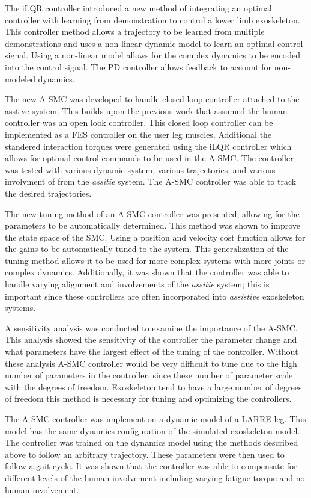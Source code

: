 The iLQR controller introduced a new method of integrating an optimal controller with learning from demonstration to control a lower limb exoskeleton. This controller method allows a trajectory to be learned from multiple demonstrations and uses a non-linear dynamic model to learn an optimal control signal.  Using a non-linear model allows for the complex dynamics to be encoded into the control signal. The PD controller allows feedback to account for non-modeled dynamics. 

The new A-SMC was developed to handle closed loop controller attached to the asstive system. This builds upon the previous work that assumed the human controller was an open look controller. This closed loop controller can be implemented as a FES controller on the user leg muscles. Additional the standered interaction torques were generated using the iLQR controller which allows for optimal control commands to be used in the A-SMC. The controller was tested with various dynamic system, various trajectories, and various involvment of from the  \textit{assitie} system. The A-SMC controller was able to track the desired trajectories. 

The new tuning method of an A-SMC controller was presented, allowing for the parameters to be automatically determined. This method was shown to improve the state space of the SMC. Using a position and velocity cost function allows for the gains to be automatically tuned to the system. This generalization of the tuning method allows it to be used for more complex systems with more joints or complex dynamics.  Additionally, it was shown that the controller was able to handle varying alignment and involvements of the \textit{assitie} system; this is important since these controllers are often incorporated into \textit{assistive} exoskeleton systems. 

A sensitivity analysis was conducted to examine the importance of the A-SMC. This analysis showed the sensitivity of the controller the parameter change and what parameters have the largest effect of the tuning of the controller. Without these analysis A-SMC controller would be very difficult to tune due to the high number of parameters in the controller, since these number of parameter scale with the degrees of freedom. Exoskeleton tend to have a large number of degrees of freedom this method is necessary for tuning and optimizing the controllers.   

The A-SMC controller was implement on a dynamic model of a LARRE leg. This model has the same dynamics configuration of the simulated exoskeleton model. The controller was trained on the dynamics model using the methods described above to follow an arbitrary trajectory. These parameters were then used to follow a gait cycle. It was shown that the controller was able to compensate for different levels of the human involvement including varying fatigue torque and no human involvement.   





